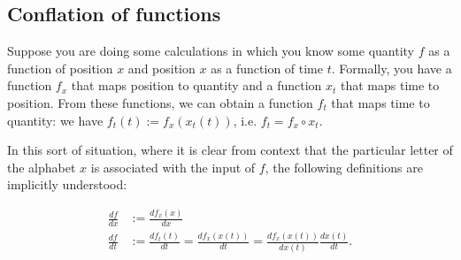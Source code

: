 \begin{comment}
Using the power rule for integer exponents, we have

\textbf{WE MUST ASSUME $c$ is an integer to use the power rule, which blocks us from obtaining the desired deriative.}

\begin{align*}
   \frac{df_{a,c}}{db}\Big|_b = c(c - 1) ... (c - k + 1)(a + b)^{c - k} = ({}_c C_k k!) (a + b)^{c - k},
\end{align*}

so $\frac{df_{a,c}}{db}\Big|_0 = ({}_c C_k k!) a^{c - k}$, and thus the Taylor series for $f_{a,c}$ centered at $0$ is

\begin{align*}
   T(b) = \sum_{k = 0}^\infty \frac{1}{k!} \frac{df_{a,c}}{db}\Big|_0 b^k = \sum_{k = 0}^\infty \frac{1}{k!} ({}_c C_k k!) a^{c - k} b^k = \sum_{k = 0}^\infty {}_c C_k a^{c - k} b^k.
\end{align*}

Letting $T_k$ denote the $k$th term of the Taylor series, we have $\lim_{k \rightarrow \infty} \Big| \frac{T_{k + 1}}{T_k} \Big| = \lim_{k \rightarrow \infty} \Big| \frac{n - k}{k + 1}a^{-1}b \Big|$. The ratio test states that if $a, b$ are such that $\lim_{k \rightarrow \infty} \Big| \frac{T_{k + 1}}{T_k} \Big| < 1$, then we have $f_{a,c}(b) = T(b)$. Using the previous expression for $\lim_{k \rightarrow \infty} \Big| \frac{T_{k + 1}}{T_k} \Big| < 1$ shows that we have $f_{a,c}(b) = T(b)$ when $|b| < |a|$.
\end{comment}

\subsection*{Conflation of functions}

Suppose you are doing some calculations in which you know some quantity $f$ as a function of position $x$ and position $x$ as a function of time $t$. Formally, you have a function $f_x$ that maps position to quantity and a function $x_t$ that maps time to position. From these functions, we can obtain a function $f_t$ that maps time to quantity: we have $f_t(t) := f_x(x_t(t))$, i.e. $f_t = f_x \circ x_t$.

In this sort of situation, where it is clear from context that the particular letter of the alphabet  $x$ is associated with the input of $f$, the following definitions are implicitly understood:

\begin{align*}
    \frac{df}{dx} &:= \frac{df_x(x)}{dx} \\
    \frac{df}{dt} &:= \frac{df_t(t)}{dt} = \frac{df_x(x(t))}{dt} = \frac{df_x(x(t))}{dx(t)} \frac{dx(t)}{dt}.
\end{align*}

